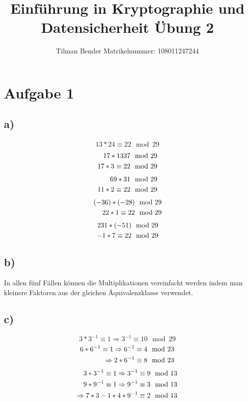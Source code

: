 \documentclass[10pt,a4paper]{article}
\author{Tilman Bender   Matrikelnummer: 108011247244\\}
\title{Einführung in Kryptographie und Datensicherheit Übung 2}
\begin{document}
\maketitle

\section*{Aufgabe 1}
\subsection*{a)}
\renewcommand{\theequation}{\roman{equation}}
\begin{align} 
13*24 \equiv 22 \mod 29 
\end{align}
\begin{align} 
17 * 1337 \mod 29 \notag\\
17 * 3 \equiv 22 \mod 29 \end
{align}
\begin{align} 
69 * 31\mod 29 \notag \\
11 * 2  \equiv 22 \mod 29 \end{align}
\begin{align}  
(-36)*(-28) \mod 29 \notag \\
22 * 1 \equiv 22 \mod 29 \end{align}
\begin{align}
231 * (-51) \mod29  \notag \\
-1 * 7 \equiv 22 \mod 29
 \end{align}
\subsection*{b)}
In allen fünf Fällen können die Multiplikationen vereinfacht werden indem man kleinere Faktoren aus der gleichen Äquivalenzklasse verwendet.
\subsection*{c)}
\setcounter{equation}{0}
\begin{equation}  3 * 3^{-1} \equiv 1 \Rightarrow 3^{-1} \equiv 10 \mod 29 \end{equation}
\begin{align}   6 * 6^{-1} \equiv 1 \Rightarrow 6^{-1} \equiv 4 \mod 23 \notag\\
 \Rightarrow 2 * 6^{-1} \equiv 8 \mod 23 \end{align}
\begin{align}   
3*3^{-1} \equiv 1\Rightarrow 3^{-1} \equiv 9 \mod 13 \notag \\
9*9^{-1} \equiv 1 \Rightarrow 9^{-1} \equiv  3 \mod 13\\
\Rightarrow 7*3-1*4*9^{-1} \equiv 2 \mod 13 \notag
\end{align}
\end{document}
